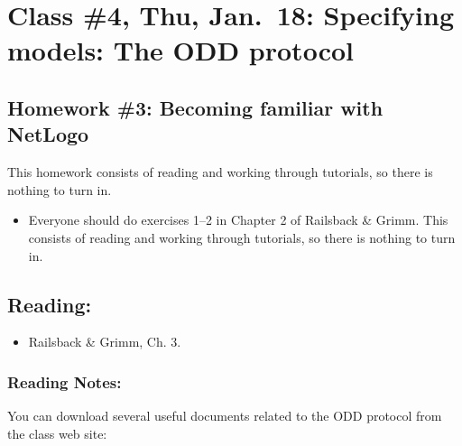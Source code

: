 \documentclass[]{article}
\providecommand{\tightlist}{%
  \setlength{\itemsep}{0pt}\setlength{\parskip}{0pt}}
\begin{document}
\hypertarget{class-4-thu-jan.18-specifying-models-the-odd-protocol}{%
\section{Class \#4, Thu, Jan.~18: Specifying models: The ODD
protocol}\label{class-4-thu-jan.18-specifying-models-the-odd-protocol}}

\hypertarget{homework-3-becoming-familiar-with-netlogo}{%
\subsection{Homework \#3: Becoming familiar with
NetLogo}\label{homework-3-becoming-familiar-with-netlogo}}

This homework consists of reading and working through tutorials, so
there is nothing to turn in.

\begin{itemize}
\tightlist
\item
  Everyone should do exercises 1--2 in Chapter 2 of Railsback \& Grimm.
  This consists of reading and working through tutorials, so there is
  nothing to turn in.
\end{itemize}

\hypertarget{reading-3}{%
\subsection{Reading:}\label{reading-3}}

\begin{itemize}
\tightlist
\item
  Railsback \& Grimm, Ch. 3.
\end{itemize}

\hypertarget{reading-notes-2}{%
\subsubsection{Reading Notes:}\label{reading-notes-2}}

You can download several useful documents related to the ODD protocol
from the class web site:
\end{document}
